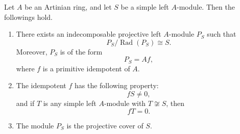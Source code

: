 \begin{theorem}\label{thm:projective-cover-simple}
    Let $A$ be an Artinian ring, and let $S$ be a simple left $A$-module. Then the followings hold.

    \begin{enumerate}
        \item There exists an indecomposable projective left $A$-module $P_S$ such that
              \[
                  P_S/\operatorname{Rad}(P_S)\cong S.
              \]
              Moreover, $P_S$ is of the form
              \[
                  P_S=Af,
              \]
              where $f$ is a primitive idempotent of $A$.

        \item The idempotent $f$ has the following property:
              \[
                  fS\neq 0,
              \]
              and if $T$ is any simple left $A$-module with $T\not\cong S$, then
              \[
                  fT=0.
              \]

        \item The module $P_S$ is the projective cover of $S$.
    \end{enumerate}
\end{theorem}

